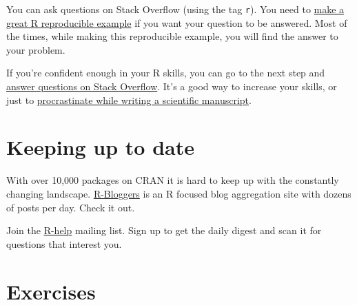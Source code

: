 \documentclass[]{book}
\theoremstyle{definition}
\theoremstyle{definition}
\theoremstyle{definition}
\theoremstyle{remark}
\begin{document}
You can ask questions on Stack Overflow (using the tag \texttt{r}). You
need to
\href{https://stackoverflow.com/questions/5963269/how-to-make-a-great-r-reproducible-example}{make
a great R reproducible example} if you want your question to be
answered. Most of the times, while making this reproducible example, you
will find the answer to your problem.

If you're confident enough in your R skills, you can go to the next step
and
\href{https://stackoverflow.com/unanswered/tagged/r?tab=newest}{answer
questions on Stack Overflow}. It's a good way to increase your skills,
or just to
\href{https://privefl.github.io/blog/one-month-as-a-procrastinator-on-stack-overflow/}{procrastinate
while writing a scientific manuscript}.

\section{Keeping up to date}\label{keeping-up-to-date}

With over 10,000 packages on CRAN it is hard to keep up with the
constantly changing landscape.
\href{https://www.r-bloggers.com/}{R-Bloggers} is an R focused blog
aggregation site with dozens of posts per day. Check it out.

Join the \href{https://www.r-project.org/mail.html}{R-help} mailing
list. Sign up to get the daily digest and scan it for questions that
interest you.

\section{Exercises}\label{exercises}
\end{document}
